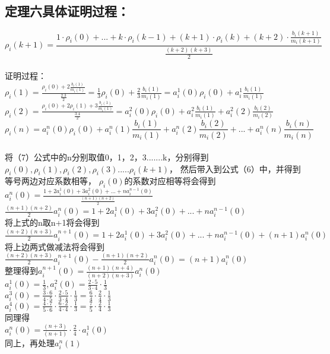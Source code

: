 \documentclass[10pt,journal,letterpaper,compsoc]{IEEEtran}
\begin{document}
\begin{CJK}{UTF8}{gkai}
\subsection*{定理六具体证明过程：}
\begin{equation}  
\rho_i(k+1)=\frac{1\cdot\rho_i(0)+...+k\cdot\rho_i(k-1)+(k+1)\cdot\rho_i(k)+(k+2)\cdot\frac{b_i(k+1)}{m_i(k+1)}}{\frac{(k+2)(k+3)}{2}}
\end{equation}
\\证明过程：
\\$\rho_i(1)=\frac{\rho_i(0)+2\frac{b_i(1)}{m_i(1)}}{\frac{2.3}{2}}=\frac{1}{3}\rho_i(0)+\frac{2}{3}\frac{b_i(1)}{m_i(1)}=a_i^1(0)\rho_i(0)+a_i^1\frac{b_i(1)}{m_i(1)}$
\\$\rho_i(2)=\frac{\rho_i(0)+2\rho_i(1)+3\frac{b_i(1)}{m_i(1)}}{\frac{3.4}{2}}=a_i^2(0)\rho_i(0)+a_i^2\frac{b_i(1)}{m_i(1)}+a_i^2(2)\frac{b_i(2)}{m_i(2)}$
\begin{equation}
\rho_i(n)=a_i^n(0)\rho_i(0)+a_i^n(1)\frac{b_i(1)}{m_i(1)}+a_i^n(2)\frac{b_i(2)}{m_i(2)}+...+a_i^n(n)\frac{b_i(n)}{m_i(n)}
\end{equation}
\\将（7）公式中的n分别取值0，1，2，3.......k，分别得到
$\rho_i(0),\rho_i(1),\rho_i(2),\rho_i(3).....\rho_i(k+1)$，
然后带入到公式（6）中，并得到等号两边对应系数相等，
$\rho_i(0)$的系数对应相等将会得到
$a_i^n(0)=\frac{1+2a_i^1(0)+3a_i^2(0)+...+na_i^{n-1}(0)}{\frac{(n+1)(n+2)}{2}}$
\\${\frac{(n+1)(n+2)}{2}}a_i^n(0)={1+2a_i^1(0)+3a_i^2(0)+...+na_i^{n-1}(0)}$
\\将上式的n取n+1将会得到
\\${\frac{(n+2)(n+3)}{2}}a_i^{n+1}(0)={1+2a_i^1(0)+3a_i^2(0)+...+na_i^{n-1}(0)+(n+1)a_i^n(0)}$ 
\\将上边两式做减法将会得到
\\${\frac{(n+2)(n+3)}{2}}a_i^{n+1}(0)-{\frac{(n+1)(n+2)}{2}}a_i^n(0)=(n+1)a_i^n(0)$
\\整理得到$a_i^{n+1}(0)=\frac{(n+1)(n+4)}{(n+2)(n+3)}a_i^n(0)$
\\$a_i^1(0)=\frac{1}{3},a_i^2(0)=\frac{2 \cdot 5}{3 \cdot 4} \cdot \frac{1}{3}$
\\$a_i^3(0)=\frac{3 \cdot 6}{4 \cdot 5 } \cdot \frac{2 \cdot 5}{3 \cdot 4} \cdot \frac{1}{3}
=\frac{6}{4} \cdot \frac{2}{4} \cdot \frac{1}{3}$
\\$a_i^4(0)=\frac{4 \cdot 7}{5 \cdot 6 } \cdot \frac{6 \cdot 2}{4 \cdot 4} \cdot \frac{1}{3}
=\frac{7}{5} \cdot \frac{2}{4} \cdot \frac{1}{3}$
\\同理得
\\$a_i^n(0)=\frac{(n+3)}{(n+1)} \cdot \frac{2}{4} \cdot a_i^1(0)$
\\同上，再处理$a_i^n(1)$


\end{CJK}
\end{document}
